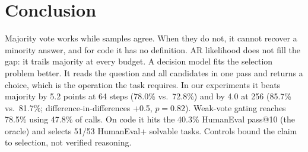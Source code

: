 \section{Conclusion}
\label{sec:conclusion}

Majority vote works while samples agree. When they do not, it cannot recover a minority answer, and for code it has no definition. AR likelihood does not fill the gap: it trails majority at every budget. A decision model fits the selection problem better. It reads the question and all candidates in one pass and returns a choice, which is the operation the task requires. In our experiments it beats majority by 5.2 points at 64 steps (78.0\% vs.\ 72.8\%) and by 4.0 at 256 (85.7\% vs.\ 81.7\%; difference-in-differences +0.5, $p=0.82$). Weak-vote gating reaches 78.5\% using 47.8\% of calls. On code it hits the 40.3\% HumanEval pass@10 (the oracle) and selects 51/53 HumanEval+ solvable tasks. Controls bound the claim to selection, not verified reasoning.

